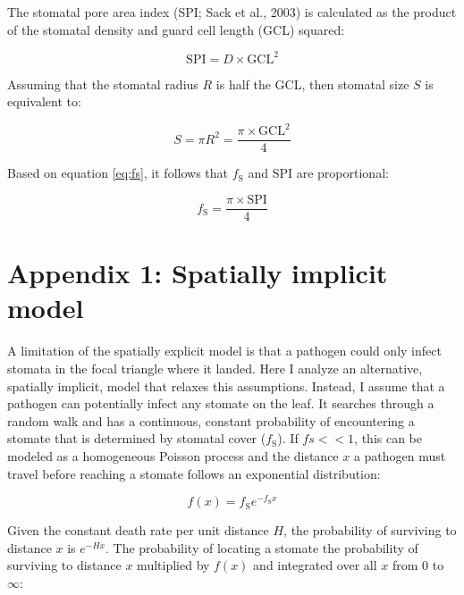 \documentclass[utf8]{frontiersSCNS}
\newcommand{\fs}{$f_\text{S}$}
\begin{document}
The stomatal pore area index (SPI; Sack et al., 2003) is calculated as
the product of the stomatal density and guard cell length (GCL) squared:

\begin{equation*}
  \mathrm{SPI} = D \times \mathrm{GCL} ^ 2
\end{equation*}

Assuming that the stomatal radius \(R\) is half the GCL, then stomatal
size \(S\) is equivalent to:

\begin{equation*}
  S = \pi R ^ 2 = \frac{\pi \times \mathrm{GCL} ^ 2}{4}
\end{equation*}

Based on equation \ref{eq:fs}, it follows that \fs{} and SPI are
proportional:

\begin{equation*}
  f_\text{S} = \frac{\pi \times \mathrm{SPI}}{4}
\end{equation*}

\clearpage

\hypertarget{appendix-1-spatially-implicit-model}{%
\section*{Appendix 1: Spatially implicit
model}\label{appendix-1-spatially-implicit-model}}

A limitation of the spatially explicit model is that a pathogen could
only infect stomata in the focal triangle where it landed. Here I
analyze an alternative, spatially implicit, model that relaxes this
assumptions. Instead, I assume that a pathogen can potentially infect
any stomate on the leaf. It searches through a random walk and has a
continuous, constant probability of encountering a stomate that is
determined by stomatal cover (\fs). If \(fs << 1\), this can be modeled
as a homogeneous Poisson process and the distance \(x\) a pathogen must
travel before reaching a stomate follows an exponential distribution:

\begin{equation*}
  f(x) = f_\text{S} e ^ {-f_\text{S} x}
\end{equation*}

Given the constant death rate per unit distance \(H\), the probability
of surviving to distance \(x\) is \(e^{-H x}\). The probability of
locating a stomate the probability of surviving to distance \(x\)
multiplied by \(f(x)\) and integrated over all \(x\) from 0 to
\(\infty\):
\end{document}
